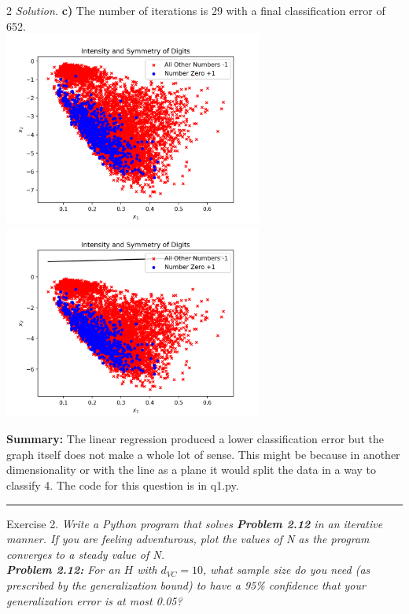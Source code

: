 \documentclass[12pt]{article}
\newcommand{\spacingfactor}{2}
\newcommand\myqed{}                 %
\newcommand{\printmyqed}[1][]       %
  {%
  \ifthenelse{\equal{#1}{Proof}}
  {\renewcommand{\myqed}{\qed}}
  {\renewcommand{\myqed}{}}
  }
\newenvironment{exercise}[1][]{%
  \bigskip                          %
  \noindent \textsf{Exercise #1.}\slshape }{}
\newenvironment{response}[1][\textit{Solution}]{%
  \printmyqed[#1]
  \begin{spacing}{\spacingfactor}
  \medskip                          %
  \noindent \textit{#1.}}{\myqed\end{spacing}\medskip\hrule}
\begin{document}
\begin{response}[Solution]
    \textbf{c)}
    The number of iterations is 29 with a final classification 
    error of 652. \\
    \includegraphics[width=85mm]{pics/c_original.png}
    \includegraphics[width=85mm]{pics/c_fit.png} 
    
    \textbf{Summary:} The linear regression produced a lower 
    classification error but the graph itself does not make a 
    whole lot of sense. This might be because in another dimensionality 
    or with the line as a plane it would split the data in a way to 
    classify 4. The code for this question is in q1.py. 
      
\end{response}



\begin{exercise}[2] %
  Write a Python program that solves \textbf{Problem 2.12 }in an iterative manner. 
  If you are feeling adventurous, plot the values of N as the 
  program converges to a steady value of N. \\
  \textbf{Problem 2.12: } For an $H$ with $d_{VC}=10$, what sample size do you need 
(as prescribed by the generalization bound) to have a 95\% confidence
that your generalization error is at most 0.05? 
\end{exercise}
   
\end{document}
